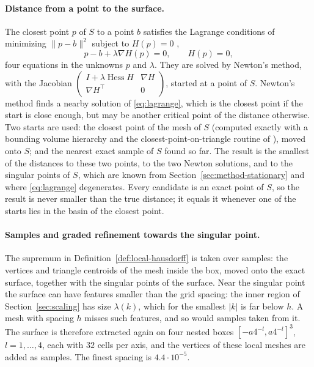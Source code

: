 \paragraph{Distance from a point to the surface.}
The closest point $p$ of $S$ to a point $b$ satisfies the Lagrange conditions
of minimizing $\|p-b\|^2$ subject to $H(p)=0$ \cite{nocedal2006numerical},
\begin{equation}
\label{eq:lagrange}
p-b+\lambda\nabla H(p)=0,\qquad H(p)=0,
\end{equation}
four equations in the unknowns $p$ and $\lambda$. They are solved by Newton's
method, with the Jacobian
$\left(\begin{smallmatrix}I+\lambda\operatorname{Hess}H & \nabla H\\ \nabla H^{\top} & 0\end{smallmatrix}\right)$,
started at a point of $S$. Newton's method finds a nearby solution of
\eqref{eq:lagrange}, which is the closest point if the start is close enough,
but may be another critical point of the distance otherwise. Two starts are
used: the closest point of the mesh of $S$ (computed exactly with a bounding
volume hierarchy and the closest-point-on-triangle routine of
\cite{ericson2004realtime}), moved onto $S$; and the nearest exact sample of
$S$ found so far. The result is the smallest of the distances to these two
points, to the two Newton solutions, and to the singular points of $S$, which
are known from Section~\ref{sec:method-stationary} and where
\eqref{eq:lagrange} degenerates. Every candidate is an exact point of $S$, so
the result is never smaller than the true distance; it equals it whenever one
of the starts lies in the basin of the closest point.

\paragraph{Samples and graded refinement towards the singular point.}
The supremum in Definition~\ref{def:local-hausdorff} is taken over samples:
the vertices and triangle centroids of the mesh inside the box, moved onto the
exact surface, together with the singular points of the surface. Near the
singular point the surface can have features smaller than the grid spacing:
the inner region of Section~\ref{sec:scaling} has size $\lambda(k)$, which for
the smallest $|k|$ is far below $h$. A mesh with spacing $h$ misses such
features, and so would samples taken from it. The surface is therefore
extracted again on four nested boxes $[-a4^{-l},a4^{-l}]^3$, $l=1,\dots,4$,
each with $32$ cells per axis, and the vertices of these local meshes are
added as samples. The finest spacing is $4.4\cdot10^{-5}$.

